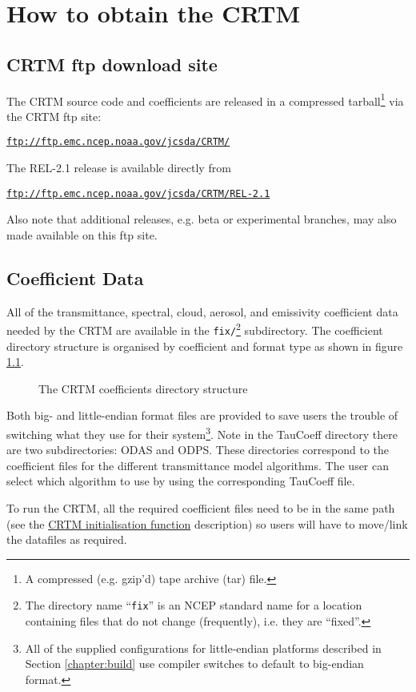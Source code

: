 \chapter{How to obtain the CRTM}
\label{chapter:get}


\section{CRTM ftp download site}
The CRTM source code and coefficients are released in a compressed tarball\footnote{A compressed (e.g. gzip'd) tape archive (tar) file.} via the CRTM ftp site:

\hspace{1cm}\href{ftp://ftp.emc.ncep.noaa.gov/jcsda/CRTM}{\texttt{ftp://ftp.emc.ncep.noaa.gov/jcsda/CRTM/}}

The REL-2.1 release is available directly from

\hspace{1cm}\href{ftp://ftp.emc.ncep.noaa.gov/jcsda/CRTM/REL-2.1}{\texttt{ftp://ftp.emc.ncep.noaa.gov/jcsda/CRTM/REL-2.1}}

Also note that additional releases, e.g. beta or experimental branches, may also made available on this ftp site.


\section{Coefficient Data}
All of the transmittance, spectral, cloud, aerosol, and emissivity coefficient data needed by the CRTM are available in the \texttt{fix/}\footnote{The directory name ``\texttt{fix}'' is an NCEP standard name for a location containing files that do not change (frequently), i.e. they are ``fixed''.} subdirectory. The coefficient directory structure is organised by coefficient and format type as shown in figure \ref{fig:crtm_coefficients_dir}.

\begin{figure}[htb]
  \centering
  
  \caption{The CRTM coefficients directory structure}
  \label{fig:crtm_coefficients_dir}
\end{figure}

Both big- and little-endian format files are provided to save users the trouble of switching what they use for their system\footnote{All of the supplied configurations for little-endian platforms described in Section \ref{chapter:build} use compiler switches to default to big-endian format.}. Note in the TauCoeff directory there are two subdirectories: ODAS and ODPS. These directories correspond to the coefficient files for the different transmittance model algorithms. The user can select which algorithm to use by using the corresponding TauCoeff file.

To run the CRTM, all the required coefficient files need to be in the same path (see the  \hyperref[sec:CRTM_Init_interface]{CRTM initialisation function} description) so users will have to move/link the datafiles as required.
